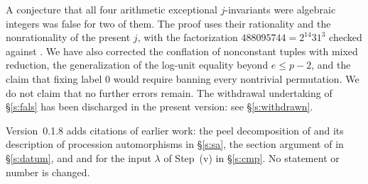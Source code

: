 \documentclass[11pt]{article}
\theoremstyle{plain}
\theoremstyle{definition}
\begin{document}
A conjecture that all four arithmetic exceptional $j$-invariants were
algebraic integers was false for two of them.  The proof uses their
rationality and the nonrationality of the present $j$, with the
factorization $488095744=2^{14}31^3$ checked against
\cite[Prop.~2.1]{MFHMP}.  We have also corrected the conflation of
nonconstant tuples with mixed reduction, the generalization of the
log-unit equality beyond $e\le p-2$, and the claim that fixing label $0$
would require banning every nontrivial permutation.  We do not claim
that no further errors remain.  The withdrawal undertaking of \S\ref{s:fals} has
been discharged in the present version: see \S\ref{s:withdrawn}.

Version~0.1.8 adds citations of earlier work: the peel decomposition of
\cite[\S3.8]{DH20} and its description of procession automorphisms
\cite[\S4.6]{DH20} in \S\ref{s:sa}, the section argument of
\cite[Lemma~2.9.2]{DH25} in \S\ref{s:datum}, and \cite{Zhou} and \cite{TK} for
the input $\lambda$ of Step~(v) in \S\ref{s:cmp}.  No statement or number is
changed.
\end{document}
